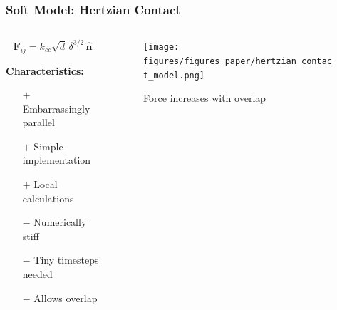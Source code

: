 \documentclass[10pt,t]{beamer}
\begin{document}
\begin{frame}
    \frametitle{Soft Model: Hertzian Contact}

    \begin{columns}
        \begin{column}{0.5\textwidth}
            \begin{equation*}
                \mathbf{F}_{ij} = k_{cc} \sqrt{d} \, \delta^{3/2} \, \hat{\mathbf{n}}
            \end{equation*}

            \vspace{0.3cm}

            \textbf{Characteristics:}
            \begin{itemize}
                \item[$+$] Embarrassingly parallel
                \item[$+$] Simple implementation
                \item[$+$] Local calculations
                \item[$-$] Numerically stiff
                \item[$-$] Tiny timesteps needed
                \item[$-$] Allows overlap
            \end{itemize}
        \end{column}

        \begin{column}{0.5\textwidth}
            \begin{figure}
                \centering
                \texttt{[image: figures/figures\_paper/hertzian\_contact\_model.png]}
                \caption*{\scriptsize{Force increases with overlap}}
            \end{figure}
        \end{column}
    \end{columns}

\end{frame}
\end{document}
